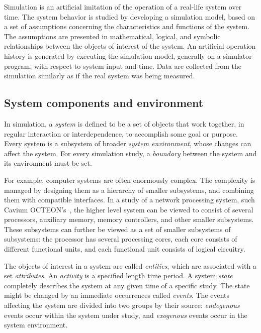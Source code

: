 Simulation is an artificial imitation of the operation of a real-life system over time. The system behavior is studied by developing a simulation model, based on a set of assumptions concerning the characteristics and functions of the system. The assumptions are presented in mathematical, logical, and symbolic relationships between the objects of interest of the system. An artificial operation history is generated by executing the simulation model, generally on a simulator program, with respect to system input and time. Data are collected from the simulation similarly as if the real system was being measured.

\subsection{System components and environment}
\label{sec:syst-comp-envir}

In simulation, a \emph{system} is defined to be a set of objects that work together, in regular interaction or interdependence, to accomplish some goal or purpose. Every system is a subsystem of broader \emph{system environment}, whose changes can affect the system. For every simulation study, a \emph{boundary} between the system and its environment must be set.~\cite{Banks:2010:DES}

For example, computer systems are often enormously complex. The complexity is managed by designing them as a hierarchy of smaller subsystems, and combining them with compatible interfaces. In a study of a network processing system, such Cavium OCTEON's~\cite{cavium:2010:fundamentals}, the higher level system can be viewed to consist of several processors, auxiliary memory, memory controllers, and other smaller subsystems. These subsystems can further be viewed as a set of smaller subsystems of subsystems: the processor has several processing cores, each core consists of different functional units, and each functional unit consists of logical circuitry.~\cite{Banks:2010:DES}

The objects of interest in a system are called \emph{entities}, which are associated with a set \emph{attributes}. An \emph{activity} is a specified length time period. A system \emph{state} completely describes the system at any given time of a specific study. The state might be changed by an immediate occurrences called \emph{events}. The events affecting the system are divided into two groups by their source: \emph{endogenous} events occur within the system under study, and \emph{exogenous} events occur in the system environment.~\cite{Banks:2010:DES}

